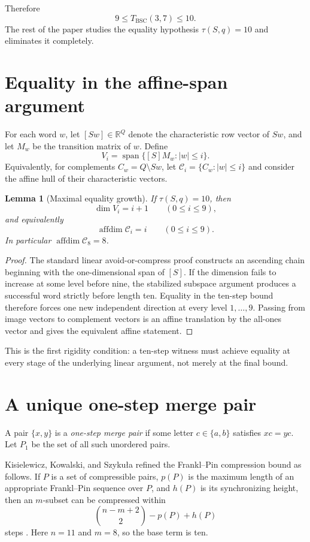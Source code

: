 \documentclass[11pt]{article}
\newtheorem{lemma}{Lemma}
\theoremstyle{definition}
\theoremstyle{remark}
\newcommand{\BSC}{\mathrm{BSC}}
\begin{document}
Therefore
\begin{equation}\label{eq:9-10}
9\le T_{\BSC}(3,7)\le10.
\end{equation}
The rest of the paper studies the equality hypothesis $\tau(S,q)=10$ and eliminates it completely.

\section{Equality in the affine-span argument}
For each word $w$, let $[Sw]\in\mathbb R^{Q}$ denote the characteristic row vector of $Sw$, and let $M_w$ be the transition matrix of $w$. Define
\[
V_i=\operatorname{span}\{[S]M_w:|w|\le i\}.
\]
Equivalently, for complements $C_w=Q\setminus Sw$, let $\mathcal C_i=\{C_w:|w|\le i\}$ and consider the affine hull of their characteristic vectors.

\begin{lemma}[Maximal equality growth]\label{lem:affine}
If $\tau(S,q)=10$, then
\[
\dim V_i=i+1\qquad(0\le i\le9),
\]
and equivalently
\[
\operatorname{affdim}\mathcal C_i=i\qquad(0\le i\le9).
\]
In particular $\operatorname{affdim}\mathcal C_8=8$.
\end{lemma}
\begin{proof}
The standard linear avoid-or-compress proof constructs an ascending chain beginning with the one-dimensional span of $[S]$. If the dimension fails to increase at some level before nine, the stabilized subspace argument produces a successful word strictly before length ten. Equality in the ten-step bound therefore forces one new independent direction at every level $1,\ldots,9$. Passing from image vectors to complement vectors is an affine translation by the all-ones vector and gives the equivalent affine statement.
\end{proof}

This is the first rigidity condition: a ten-step witness must achieve equality at every stage of the underlying linear argument, not merely at the final bound.

\section{A unique one-step merge pair}
A pair $\{x,y\}$ is a \emph{one-step merge pair} if some letter $c\in\{a,b\}$ satisfies $xc=yc$. Let $P_1$ be the set of all such unordered pairs.

Kisielewicz, Kowalski, and Szyku\l a refined the Frankl--Pin compression bound as follows. If $P$ is a set of compressible pairs, $p(P)$ is the maximum length of an appropriate Frankl--Pin sequence over $P$, and $h(P)$ is its synchronizing height, then an $m$-subset can be compressed within
\[
\binom{n-m+2}{2}-p(P)+h(P)
\]
steps \cite{KKS2016}. Here $n=11$ and $m=8$, so the base term is ten.
\end{document}
